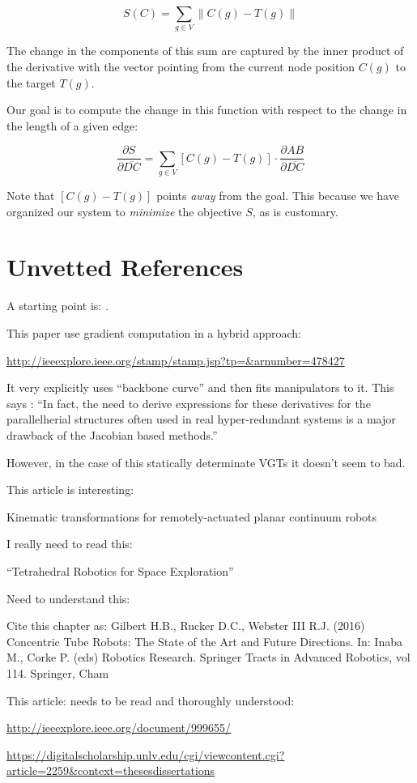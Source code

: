 \documentclass[11pt]{article}
\begin{document}
\[
S(C) = \sum_{g\in V} \| C(g) - T(g) \|
\]

The change in the components of this sum are captured by the inner product of the derivative with the vector
pointing from the current node position $C(g)$ to the target $T(g)$.

Our goal is to compute the change in this function with respect to the change in the length of a given edge:

\[
\frac{\partial S}{\partial \overline{DC}} =
\sum_{g\in V} [C(g) - T(g)] \cdot \frac{\partial AB }{\partial \overline{DC}} 
\]

Note that $[C(g) - T(g)]$ points {\em away} from the goal. This because we have organized our system to {\em minimize} the objective $S$,
as is customary.




\section{Unvetted References}

A starting point is: \cite{Hanahara2008}.

This paper use gradient computation in a hybrid approach:

\url{http://ieeexplore.ieee.org/stamp/stamp.jsp?tp=&arnumber=478427}

It very explicitly uses ``backbone curve'' and then fits manipulators to it.
This says :  ``In fact, the need to derive expressions for these
derivatives for the parallelherial structures often used in real
hyper-redundant systems is a major drawback of the Jacobian
based methods.''

However, in the case of this statically determinate VGTs it doesn't seem to bad.

This article is interesting:

Kinematic transformations for remotely-actuated planar continuum robots

I really need to read this:

``Tetrahedral Robotics for Space Exploration''

Need to understand this:

Cite this chapter as:
Gilbert H.B., Rucker D.C., Webster III R.J. (2016) Concentric Tube Robots: The State of the Art and Future Directions. In: Inaba M., Corke P. (eds) Robotics Research. Springer Tracts in Advanced Robotics, vol 114. Springer, Cham

This article: needs to be read and thoroughly understood:

\url{http://ieeexplore.ieee.org/document/999655/}

\url{https://digitalscholarship.unlv.edu/cgi/viewcontent.cgi?article=2259&context=thesesdissertations}



\end{document}

